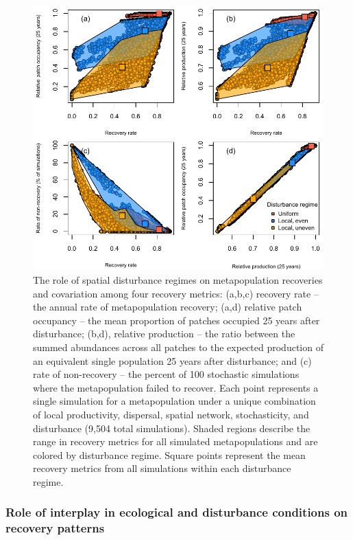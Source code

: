 \documentclass[
]{article}
\begin{document}
\begin{figure}[H]

{\centering \includegraphics{Managing_for_ecological_surprises_in_metapopulations_files/figure-latex/disturbance regime-1} 

}

\caption{The role of spatial disturbance regimes on metapopulation recoveries and covariation among four recovery metrics: (a,b,c) recovery rate – the annual rate of metapopulation recovery; (a,d) relative patch occupancy – the mean proportion of patches occupied 25 years after disturbance; (b,d), relative production – the ratio between the summed abundances across all patches to the expected production of an equivalent single population 25 years after disturbance; and (c) rate of non-recovery – the percent of 100 stochastic simulations where the metapopulation failed to recover. Each point represents a single simulation for a metapopulation under a unique combination of local productivity, dispersal, spatial network, stochasticity, and disturbance (9,504 total simulations). Shaded regions describe the range in recovery metrics for all simulated metapopulations and are colored by disturbance regime. Square points represent the mean recovery metrics from all simulations within each disturbance regime.}\label{fig:disturbance regime}
\end{figure}
\newpage

\hypertarget{role-of-interplay-in-ecological-and-disturbance-conditions-on-recovery-patterns}{%
\subsubsection{Role of interplay in ecological and disturbance
conditions on recovery
patterns}\label{role-of-interplay-in-ecological-and-disturbance-conditions-on-recovery-patterns}}
\end{document}
